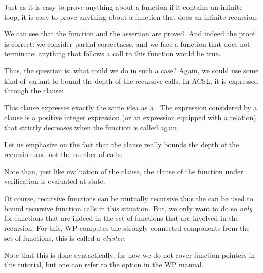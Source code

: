 Just as it is easy to prove anything about a function if it contains an
infinite loop, it is easy to prove anything about a function that does an
infinite recursion:






We can see that the function and the assertion are proved. And indeed the
proof is correct: we consider partial correctness, and we face a function
that does not terminate: anything that follows a call to this function would
be true.


Thus, the question is: what could we do in such a case? Again, we could use
some kind of variant to bound the depth of the recursive calls. In ACSL, it is
expressed through the  clause:





This clause expresses exactly the same idea as a .
The expression considered by a  clause is a positive
integer expression (or an expression equipped with a relation) that strictly
decreases when the function is called again.



Let us emphasize on the fact that the  clause really
bounds the depth of the recursion and not the number of calls:






Note than, just like evaluation of the  clause, the
clause of the function under verification is evaluated at 
state:





Of course, recursive functions can be mutually recursive thus the
 can be used to bound recursive function calls in this
situation. But, we only want to do so {\em only} for functions that are indeed
in the set of functions that are involved in the recursion. For this, WP
computes the strongly connected components from the set of functions, this is
called a {\em cluster}.


\begin{Information}
  Note that this is done syntactically, for now we do not cover function
  pointers in this tutorial, but one can refer to the option
   in the WP manual.
\end{Information}


